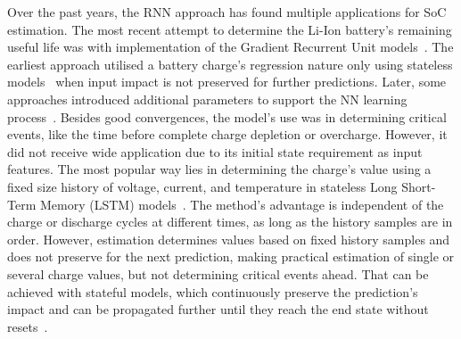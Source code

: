 % 
%
Over the past years, the RNN approach has found multiple applications for SoC estimation.
The most recent attempt to determine the Li-Ion battery's remaining useful life was with implementation of the Gradient Recurrent Unit models~\cite{song_lithium-ion_2018,javid_adaptive_2020,xiao_accurate_2019,jiao_gru-rnn_2020}.
The earliest approach utilised a battery charge's regression nature only using stateless models~\cite{song_lithium-ion_2018,jiao_gru-rnn_2020,xiao_accurate_2019} when input impact is not preserved for further predictions.
Later, some approaches introduced additional parameters to support the NN learning process~\cite{mamo_long_2020,jiao_gru-rnn_2020,javid_adaptive_2020}.
Besides good convergences, the model's use was in determining critical events, like the time before complete charge depletion or overcharge.
However, it did not receive wide application due to its initial state requirement as input features.
The most popular way lies in determining the charge's value using a fixed size history of voltage, current, and temperature in stateless Long Short-Term Memory (LSTM) models~\cite{Chemali2017,mamo_long_2020,javid_adaptive_2020,zhang_deep_2020}.
The method's advantage is independent of the charge or discharge cycles at different times, as long as the history samples are in order.
However, estimation determines values based on fixed history samples and does not preserve for the next prediction, making practical estimation of single or several charge values, but not determining critical events ahead.
That can be achieved with stateful models, which continuously preserve the prediction's impact and can be propagated further until they reach the end state without resets~\cite{zhu_statefulnes_tfdocs_2020}.

